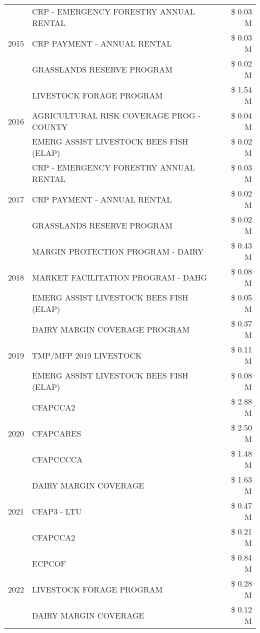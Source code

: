 \begin{tabular}{llr}
\cline{1-3}
\multirow[t]{3}{*}{2015} & CRP - EMERGENCY FORESTRY ANNUAL RENTAL & \$ 0.03 M \\
 & CRP PAYMENT - ANNUAL RENTAL & \$ 0.03 M \\
 & GRASSLANDS RESERVE PROGRAM & \$ 0.02 M \\
\cline{1-3}
\multirow[t]{3}{*}{2016} & LIVESTOCK FORAGE PROGRAM & \$ 1.54 M \\
 & AGRICULTURAL RISK COVERAGE PROG - COUNTY & \$ 0.04 M \\
 & EMERG ASSIST LIVESTOCK BEES FISH (ELAP) & \$ 0.02 M \\
\cline{1-3}
\multirow[t]{3}{*}{2017} & CRP - EMERGENCY FORESTRY ANNUAL RENTAL & \$ 0.03 M \\
 & CRP PAYMENT - ANNUAL RENTAL & \$ 0.02 M \\
 & GRASSLANDS RESERVE PROGRAM & \$ 0.02 M \\
\cline{1-3}
\multirow[t]{3}{*}{2018} & MARGIN PROTECTION PROGRAM - DAIRY & \$ 0.43 M \\
 & MARKET FACILITATION PROGRAM - DAHG & \$ 0.08 M \\
 & EMERG ASSIST LIVESTOCK BEES FISH (ELAP) & \$ 0.05 M \\
\cline{1-3}
\multirow[t]{3}{*}{2019} & DAIRY MARGIN COVERAGE PROGRAM & \$ 0.37 M \\
 & TMP/MFP 2019 LIVESTOCK & \$ 0.11 M \\
 & EMERG ASSIST LIVESTOCK BEES FISH (ELAP) & \$ 0.08 M \\
\cline{1-3}
\multirow[t]{3}{*}{2020} & CFAPCCA2 & \$ 2.88 M \\
 & CFAPCARES & \$ 2.50 M \\
 & CFAPCCCCA & \$ 1.48 M \\
\cline{1-3}
\multirow[t]{3}{*}{2021} & DAIRY MARGIN COVERAGE & \$ 1.63 M \\
 & CFAP3 - LTU & \$ 0.47 M \\
 & CFAPCCA2 & \$ 0.21 M \\
\cline{1-3}
\multirow[t]{3}{*}{2022} & ECPCOF & \$ 0.84 M \\
 & LIVESTOCK FORAGE PROGRAM & \$ 0.28 M \\
 & DAIRY MARGIN COVERAGE & \$ 0.12 M \\
\cline{1-3}
\bottomrule
\end{tabular}

